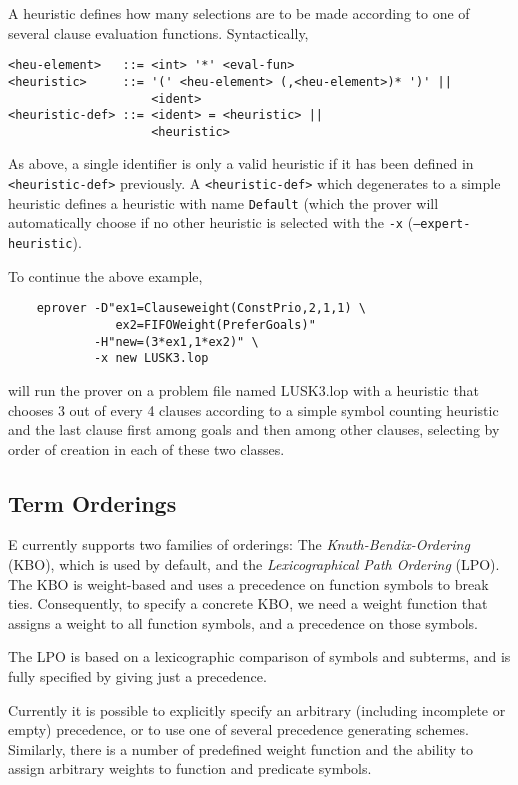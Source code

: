 \documentclass{article}
\begin{document}
A heuristic defines how many selections are to be made according to
one of several clause evaluation functions. Syntactically,

\begin{verbatim}
<heu-element>   ::= <int> '*' <eval-fun>
<heuristic>     ::= '(' <heu-element> (,<heu-element>)* ')' ||
                    <ident>
<heuristic-def> ::= <ident> = <heuristic> ||
                    <heuristic>
\end{verbatim}

As above, a single identifier is only a valid heuristic if it has been
defined in \texttt{<heuristic-def>} previously. A
\texttt{<heuristic-def>} which degenerates to a simple heuristic
defines a heuristic with name \texttt{Default} (which the prover will
automatically choose if no other heuristic is selected with the
\texttt{-x} (\texttt{--expert-heuristic}).

\begin{example}
  To continue the above example,
\begin{verbatim}
    eprover -D"ex1=Clauseweight(ConstPrio,2,1,1) \
               ex2=FIFOWeight(PreferGoals)" 
            -H"new=(3*ex1,1*ex2)" \
            -x new LUSK3.lop
\end{verbatim}
  will run the prover on a problem file named LUSK3.lop with a
  heuristic that chooses 3 out of every 4 clauses according to a
  simple symbol counting heuristic and the last clause first among
  goals and then among other clauses, selecting by order of creation
  in each of these two classes.
\end{example}


\subsection{Term Orderings}
\label{sec:options:orderings}

E currently supports two families of orderings: The
\emph{Knuth-Bendix-Ordering} (KBO), which is used by default, and the
\emph{Lexicographical Path Ordering} (LPO). The KBO is weight-based
and uses a precedence on function symbols to break ties. Consequently,
to specify a concrete KBO, we need a weight function that assigns a
weight to all function symbols, and a precedence on those symbols.

The LPO is based on a lexicographic comparison of symbols and
subterms, and is fully specified by giving just a precedence.

Currently it is possible to explicitly specify an arbitrary
(including incomplete or empty) precedence, or to use one of several
precedence generating schemes. Similarly, there is a number of
predefined weight function and the ability to assign arbitrary weights
to function and predicate symbols.
\end{document}
